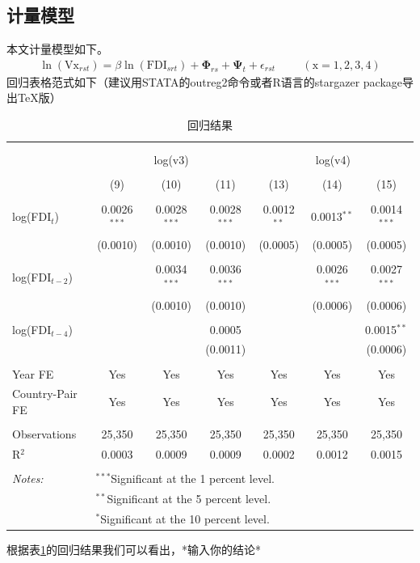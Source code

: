 \documentclass[12pt]{ctexart}
\begin{document}
\subsection{计量模型}
本文计量模型如下。
\begin{eqnarray}
\ln(\mathrm{Vx}_{rst}) = \beta\ln(\mathrm{FDI}_{srt}) + \bm\Phi_{rs} + \bm\Psi_t+\epsilon_{rst}\hspace{1cm}(\mathrm{x} = 1,2,3,4)
\end{eqnarray}
回归表格范式如下（建议用STATA的outreg2命令或者R语言的stargazer package导出\TeX 版）
\begin{table}[H] \centering 
\caption{回归结果}
\vspace{0.5em}
  \small
\begin{tabular}{@{\extracolsep{5pt}}lcccccc} 
\\[-3ex]\hline 
\hline \\[-3ex] 
\\[-4ex] & \multicolumn{3}{c}{log(v3)} & \multicolumn{3}{c}{log(v4)} \\ 
\\[-4ex] & (9) & (10) & (11)  & (13) & (14) & (15) \\ 
\hline \\[-1.8ex] 
 log(FDI$_{t}$) & 0.0026$^{***}$ & 0.0028$^{***}$ & 0.0028$^{***}$ & 0.0012$^{**}$ & 0.0013$^{**}$ & 0.0014$^{***}$  \\ 
  & (0.0010) & (0.0010) & (0.0010)  & (0.0005) & (0.0005) & (0.0005)  \\ 
  & & & & &   \\ 
 log(FDI$_{t-2}$) &  & 0.0034$^{***}$ & 0.0036$^{***}$ &  & 0.0026$^{***}$ & 0.0027$^{***}$ \\ 
  &  & (0.0010)  & (0.0010) &  & (0.0006) & (0.0006)  \\ 
  & & & & &   \\ 
 log(FDI$_{t-4}$) &  &  & 0.0005 &  &  & 0.0015$^{**}$  \\ 
  &  &  & (0.0011)  &  &  & (0.0006)  \\ 
  & & & & &   \\ 
      \hline
  Year FE&Yes&Yes&Yes&Yes&Yes&Yes\\
  Country-Pair FE&Yes&Yes&Yes&Yes&Yes&Yes\\
    \hline\\[-1.8ex]
Observations & 25,350 & 25,350 & 25,350  & 25,350 & 25,350 & 25,350\\ 
R$^{2}$ & 0.0003 & 0.0009 & 0.0009  & 0.0002 & 0.0012 & 0.0015  \\ 
\hline \\[-1.8ex] 
\textit{Notes:} & \multicolumn{6}{l}{$^{***}$Significant at the 1 percent level.} \\ 
 & \multicolumn{6}{l}{$^{**}$Significant at the 5 percent level.} \\ 
 & \multicolumn{6}{l}{$^{*}$Significant at the 10 percent level.} \\ 
\end{tabular} 
\label{hgjg2} 
\end{table} 
根据表\ref{hgjg2}的回归结果我们可以看出，*输入你的结论*
\end{document}

